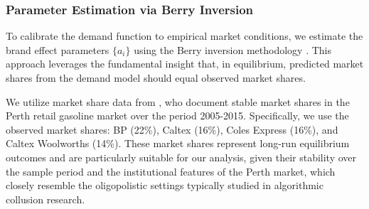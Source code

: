 






\subsubsection*{Parameter Estimation via Berry Inversion}

To calibrate the demand function to empirical market conditions, we estimate the brand effect parameters $\{a_i\}$ using the Berry inversion methodology \parencite{berry_estimating_1994}. This approach leverages the fundamental insight that, in equilibrium, predicted market shares from the demand model should equal observed market shares.

We utilize market share data from \textcite{byrne_learning_2019}, who document stable market shares in the Perth retail gasoline market over the period 2005-2015. Specifically, we use the observed market shares: BP (22\%), Caltex (16\%), Coles Express (16\%), and Caltex Woolworths (14\%). These market shares represent long-run equilibrium outcomes and are particularly suitable for our analysis, given their stability over the sample period and the institutional features of the Perth market, which closely resemble the oligopolistic settings typically studied in algorithmic collusion research.


